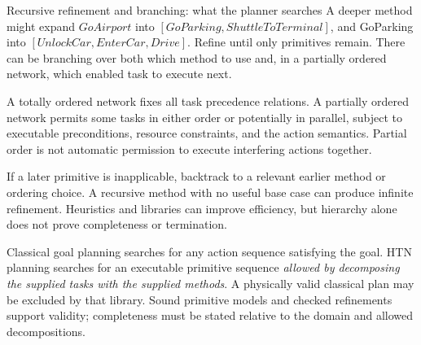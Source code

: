 \documentclass[10pt,a4paper]{article}
\begin{document}
\begin{card}{Recursive refinement and branching: what the planner searches}
A deeper method might expand $GoAirport$ into $[GoParking,ShuttleToTerminal]$, and GoParking into $[UnlockCar,EnterCar,Drive]$. Refine until only primitives remain. There can be branching over both which method to use and, in a partially ordered network, which enabled task to execute next.

A totally ordered network fixes all task precedence relations. A partially ordered network permits some tasks in either order or potentially in parallel, subject to executable preconditions, resource constraints, and the action semantics. Partial order is not automatic permission to execute interfering actions together.

If a later primitive is inapplicable, backtrack to a relevant earlier method or ordering choice. A recursive method with no useful base case can produce infinite refinement. Heuristics and libraries can improve efficiency, but hierarchy alone does not prove completeness or termination.
\end{card}

\begin{note}
Classical goal planning searches for any action sequence satisfying the goal. HTN planning searches for an executable primitive sequence \emph{allowed by decomposing the supplied tasks with the supplied methods}. A physically valid classical plan may be excluded by that library. Sound primitive models and checked refinements support validity; completeness must be stated relative to the domain and allowed decompositions.
\end{note}
\end{document}

